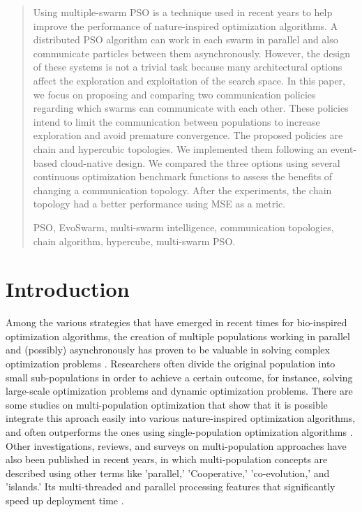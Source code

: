 \documentclass[runningheads]{llncs}
\newcommand{\keywords}[1]{\par\addvspace\baselineskip
\noindent\keywordname\enspace\ignorespaces#1}
\begin{document}
\begin{abstract}

  Using multiple-swarm PSO is a technique used in recent years to help improve
  the performance of nature-inspired optimization algorithms. A distributed PSO
  algorithm can work in each swarm in parallel and also communicate particles
  between them asynchronously. However, the design of these systems is not a
  trivial task because many architectural options affect the exploration and
  exploitation of the search space. In this paper, we focus on proposing and
  comparing two communication policies regarding which swarms can communicate
  with each other. These policies intend to limit the communication between
  populations to increase exploration and avoid premature convergence. The
  proposed policies are chain and hypercubic topologies. We implemented them
  following an event-based cloud-native design. We compared the three options
  using several continuous optimization benchmark functions to assess the
  benefits of changing a communication topology. After the experiments, the
  chain topology had a better performance using MSE as a metric.
  
  
                   

\keywords{PSO, EvoSwarm, multi-swarm intelligence, communication topologies,
 chain algorithm, hypercube, multi-swarm PSO.}
\end{abstract}


\section{Introduction}


Among the various strategies that have emerged in recent times for bio-inspired
optimization algorithms, the creation of multiple populations working
in parallel and (possibly) asynchronously has proven to be valuable in 
solving complex optimization problems \cite{a1}.
Researchers often divide the original population into small sub-populations in order to 
achieve a certain outcome, for instance, solving large-scale optimization problems and dynamic
optimization problems. There are some studies on multi-population optimization that show
that it is possible integrate this aproach easily into various nature-inspired optimization algorithms,
and often outperforms the ones using single-population optimization algorithms \cite{b11} \cite{b12}.
Other investigations, reviews, and surveys on multi-population approaches have also
been published in recent years, in which multi-population concepts are described
using other terms like 'parallel,' 'Cooperative,' 'co-evolution,' and 'islands.'
Its multi-threaded and parallel processing features that significantly speed up
deployment time \cite{b13} \cite{b14}.
\end{document}
